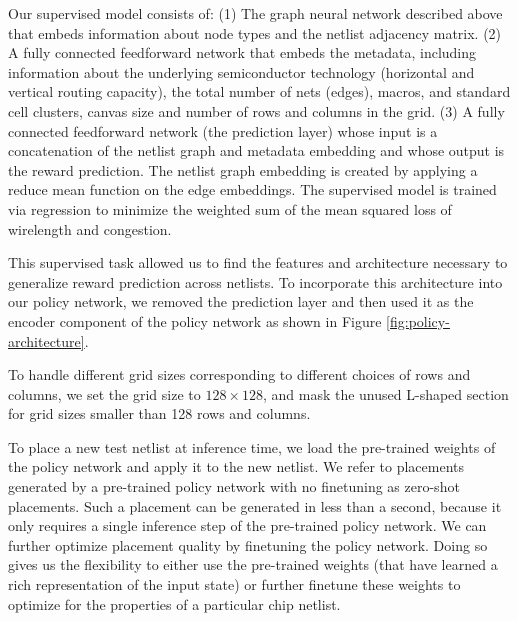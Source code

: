 \documentclass{article}
\begin{document}
Our supervised model consists of: (1) The graph neural network described above that embeds information about node types and the netlist adjacency matrix. (2) A fully connected feedforward network that embeds the metadata, including information about the underlying semiconductor technology (horizontal and vertical routing capacity), the total number of nets (edges), macros, and standard cell clusters, canvas size and number of rows and columns in the grid. (3) A fully connected feedforward network (the prediction layer) whose input is a concatenation of the netlist graph and metadata embedding and whose output is the reward prediction. The netlist graph embedding is created by applying a reduce mean function on the edge embeddings. The supervised model is trained via regression to minimize the weighted sum of the mean squared loss of wirelength and congestion. 

This supervised task allowed us to find the features and architecture necessary to generalize reward prediction across netlists. To incorporate this architecture into our policy network, we removed the prediction layer and then used it as the encoder component of the policy network as shown in Figure \ref{fig:policy-architecture}.

To handle different grid sizes corresponding to different choices of rows and columns, we set the grid size to $128\times 128$, and mask the unused L-shaped section for grid sizes smaller than 128 rows and columns.

To place a new test netlist at inference time, we load the pre-trained weights of the policy network and apply it to the new netlist. We refer to placements generated by a pre-trained policy network with no finetuning as zero-shot placements. Such a placement can be generated in less than a second, because it only requires a single inference step of the pre-trained policy network. We can further optimize placement quality by finetuning the policy network. Doing so gives us the flexibility to either use the pre-trained weights (that have learned a rich representation of the input state) or further finetune these weights to optimize for the properties of a particular chip netlist.  

\end{document}
